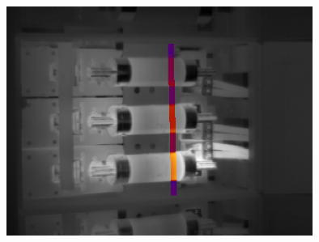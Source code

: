 \documentclass[12pt,twoside,a4paper,titlepage]{report}
\begin{document}
\begin{figure}[ht]
 \centering
 \includegraphics[width=10cm, keepaspectratio=true width=10cm]{img/FLIR_P60_hl_line}

\end{figure}
\end{document}
